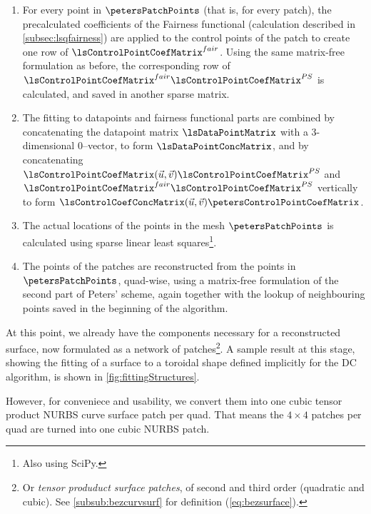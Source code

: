\begin{enumerate}
\begin{enumerate}[label=(\alph*)]
\end{enumerate}
\item For every point in $\petersPatchPoints$ (that is, for every \Bez patch), the precalculated coefficients of the Fairness functional (calculation described in \autoref{subsec:lsqfairness}) are applied to the \Bez control points of the patch to create one row of $\lsControlPointCoefMatrix^{fair}$. Using the same matrix-free formulation as before, the corresponding row of $\lsControlPointCoefMatrix^{fair}\lsControlPointCoefMatrix^{PS}$ is calculated, and saved in another sparse matrix.
\item The fitting to datapoints and fairness functional parts are combined by concatenating the datapoint matrix $\lsDataPointMatrix$ with a 3-dimensional $0$--vector, to form $\lsDataPointConcMatrix$, and by concatenating $\lsControlPointCoefMatrix(\vec{u},\vec{v})\lsControlPointCoefMatrix^{PS}$ and  $\lsControlPointCoefMatrix^{fair}\lsControlPointCoefMatrix^{PS}$ vertically to form $\lsControlCoefConcMatrix(\vec{u},\vec{v})\petersControlPointCoefMatrix$.
\item The actual locations of the points in the mesh $\petersPatchPoints$ is calculated using sparse linear least squares\footnote{Also using SciPy.}.
\item The \Bez points of the patches are reconstructed from the points in $\petersPatchPoints$, quad-wise, using a matrix-free formulation of the second part of Peters' scheme, again together with the lookup of neighbouring points saved in the beginning of the algorithm.
\end{enumerate}
At this point, we already have the components necessary for a reconstructed surface, now formulated as a network of \Bez patches\footnote{Or \emph{tensor produduct \Bez surface patches}, of second and third order (quadratic and cubic). See \autoref{subsub:bezcurvsurf} for definition (\autoref{eq:bezsurface}).}. A sample result at this stage, showing the fitting of a surface to a toroidal shape defined implicitly for the \acs{DC} algorithm, is shown in \autoref{fig:fittingStructures}. 

However, for conveniece and usability, we convert them into one cubic tensor product NURBS curve surface patch per quad. That means the $4\times4$ \Bez patches per quad are turned into one cubic NURBS patch. 


